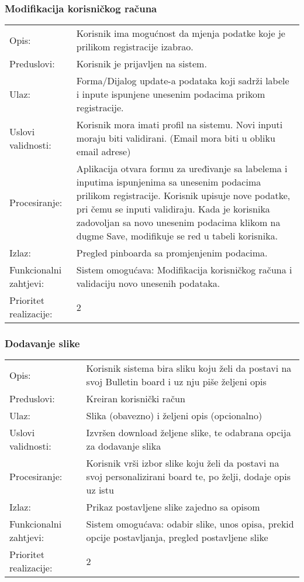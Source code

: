 \subsubsection{Modifikacija korisničkog računa}

\begin{tabu} to 1.2
 Opis: & Korisnik ima mogućnost da mjenja podatke koje je prilikom registracije izabrao. \\
Preduslovi: & Korisnik je prijavljen na sistem. \\
Ulaz: & Forma/Dijalog update-a podataka koji sadrži labele i inpute ispunjene unesenim podacima prikom registracije. \\
Uslovi validnosti: & Korisnik mora imati profil na sistemu. Novi inputi moraju biti validirani. (Email mora biti u obliku email adrese) \\
Procesiranje: & Aplikacija otvara formu za uređivanje sa labelema i inputima ispunjenima sa unesenim podacima prilikom registracije. Korisnik upisuje nove podatke, pri čemu se inputi validiraju. Kada je korisnika zadovoljan sa novo unesenim podacima klikom na dugme Save, modifikuje se red u tabeli korisnika. \\
Izlaz: & Pregled pinboarda sa promjenjenim podacima. \\
Funkcionalni zahtjevi: & Sistem omogućava: Modifikacija korisničkog računa i validaciju novo unesenih podataka. \\
Prioritet realizacije: & 2

\end{tabu}
\newpage
\subsubsection{Dodavanje slike}

\begin{tabu} to 1.2
 Opis: & Korisnik sistema bira sliku koju želi da postavi na svoj Bulletin board i uz nju piše željeni opis\\
Preduslovi: & Kreiran korisnički račun \\
Ulaz: & Slika (obavezno) i željeni opis (opcionalno) \\
Uslovi validnosti: & Izvršen download željene slike, te odabrana opcija za dodavanje slika \\
Procesiranje: & Korisnik vrši izbor slike koju želi da postavi na svoj personalizirani board te, po želji, dodaje opis uz istu \\
Izlaz: & Prikaz postavljene slike zajedno sa opisom \\
Funkcionalni zahtjevi: & Sistem omogućava: odabir slike, unos opisa, prekid opcije postavljanja, pregled postavljene slike \\
Prioritet realizacije: & 2

\end{tabu}
\newpage
